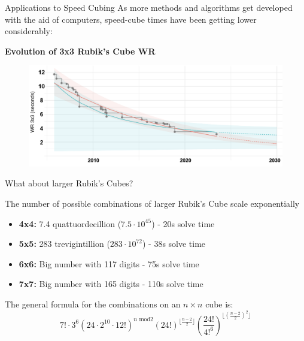 \documentclass[final]{beamer}
\newlength{\colwidth}
\begin{document}
\begin{frame}[t]
\begin{columns}[t]
\begin{column}{\colwidth}
\begin{block}{Applications to Speed Cubing}
  As more methods and algorithms get developed with the aid of computers,
  speed-cube times have been getting lower considerably:

  \begin{center}
    \textbf{Evolution of 3x3 Rubik's Cube WR}
  \end{center}

  \begin{figure}
    \centering
      \includegraphics[width=1.0\textwidth]{logos/solveprogression.png}
  \end{figure}

  \end{block}

  \begin{block}{What about larger Rubik's Cubes?}
    
    \large The number of possible combinations of larger Rubik's Cube scale exponentially \\
    
    \begin{itemize}
      \item \textbf{4x4:} 7.4 quattuordecillion ($7.5\cdot 10^{45}$) - 20s solve time
      \item \textbf{5x5:} 283 trevigintillion ($283 \cdot 10^{72}$) - 38s solve time
      \item \textbf{6x6:} Big number with 117 digits - 75s solve time
      \item \textbf{7x7:} Big number with 165 digits - 110s solve time
    \end{itemize}

    The general formula for the combinations on an $n \times n$ cube is: \\

    $$ \displaystyle 7! \cdot  3^6 \left( 24 \cdot 2^{10} \cdot 12!  \right)^{n \text{ mod} 2}
    (24!)^{\lfloor \frac{n-2}{2} \rfloor} \left( \displaystyle\frac{24!}{4!^{6}} 
    \right)^{\lfloor \left( \frac{n-2}{2} \right)^2 \rfloor} $$ \\



\end{block}
\end{column}
\end{columns}
\end{frame}
\end{document}
